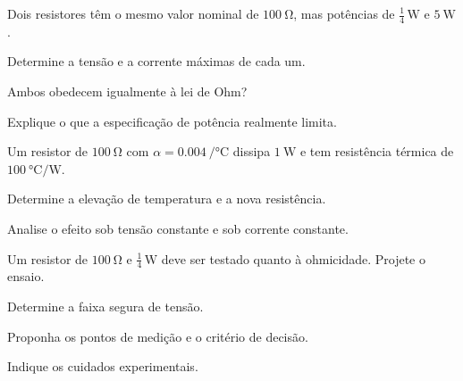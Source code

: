 \begin{questao}[3]{}

Dois resistores têm o mesmo valor nominal de $\SI{100}{\ohm}$, mas potências de
$\frac14\,\si{\watt}$ e $\SI{5}{\watt}$.
\begin{itensq}
\item Determine a tensão e a corrente máximas de cada um.
\item Ambos obedecem igualmente à lei de Ohm?
\item Explique o que a especificação de potência realmente limita.
\end{itensq}


\end{questao}
\begin{questao}[3]{}

Um resistor de $\SI{100}{\ohm}$ com $\alpha=\SI{+0.004}{\per\celsius}$ dissipa
$\SI{1}{\watt}$ e tem resistência térmica de
$\SI{100}{\celsius\per\watt}$.
\begin{itensq}
\item Determine a elevação de temperatura e a nova resistência.
\item Analise o efeito sob tensão constante e sob corrente constante.
\end{itensq}


\end{questao}
\begin{questao}[3]{}

Um resistor de $\SI{100}{\ohm}$ e $\frac14\,\si{\watt}$ deve ser testado quanto
à ohmicidade. Projete o ensaio.
\begin{itensq}
\item Determine a faixa segura de tensão.
\item Proponha os pontos de medição e o critério de decisão.
\item Indique os cuidados experimentais.
\end{itensq}


\end{questao}

